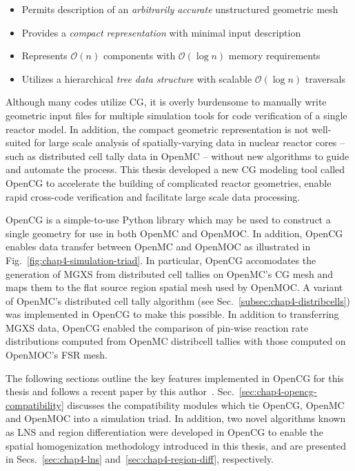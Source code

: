 \begin{itemize}[noitemsep]
  \item Permits description of an \textit{arbitrarily accurate} unstructured geometric mesh
  \item Provides a \textit{compact representation} with minimal input description
  \item Represents $\mathcal{O}(n)$ components with $\mathcal{O}(\log{}n)$ memory requirements
  \item Utilizes a hierarchical \textit{tree data structure} with scalable $\mathcal{O}(\log{}n)$ traversals
\end{itemize}

\noindent Although many codes utilize \ac{CG}, it is overly burdensome to manually write geometric input files for multiple simulation tools for code verification of a single reactor model. In addition, the compact geometric representation is not well-suited for large scale analysis of spatially-varying data in nuclear reactor cores -- such as distributed cell tally data in OpenMC -- without new algorithms to guide and automate the process. This thesis developed a new \ac{CG} modeling tool called OpenCG to accelerate the building of complicated reactor geometries, enable rapid cross-code verification and facilitate large scale data processing. 

OpenCG is a simple-to-use Python library which may be used to construct a single geometry for use in both OpenMC and OpenMOC. In addition, OpenCG enables data transfer between OpenMC and OpenMOC as illustrated in Fig.~\ref{fig:chap4-simulation-triad}. In particular, OpenCG accomodates the generation of \ac{MGXS} from distributed cell tallies on OpenMC's \ac{CG} mesh and maps them to the flat source region spatial mesh used by OpenMOC. A variant of OpenMC's distributed cell tally algorithm (see Sec.~\ref{subsec:chap4-distribcells}) was implemented in OpenCG to make this possible. In addition to transferring \ac{MGXS} data, OpenCG enabled the comparison of pin-wise reaction rate distributions computed from OpenMC distribcell tallies with those computed on OpenMOC's \ac{FSR} mesh.

The following sections outline the key features implemented in OpenCG for this thesis and follows a recent paper by this author~\cite{boyd2015opencg}. Sec.~\ref{sec:chap4-opencg-compatibility} discusses the compatibility modules which tie OpenCG, OpenMC and OpenMOC into a simulation triad. In addition, two novel algorithms known as \ac{LNS} and region differentiation were developed in OpenCG to enable the spatial homogenization methodology introduced in this thesis, and are presented in Secs.~\ref{sec:chap4-lns} and~\ref{sec:chap4-region-diff}, respectively.


